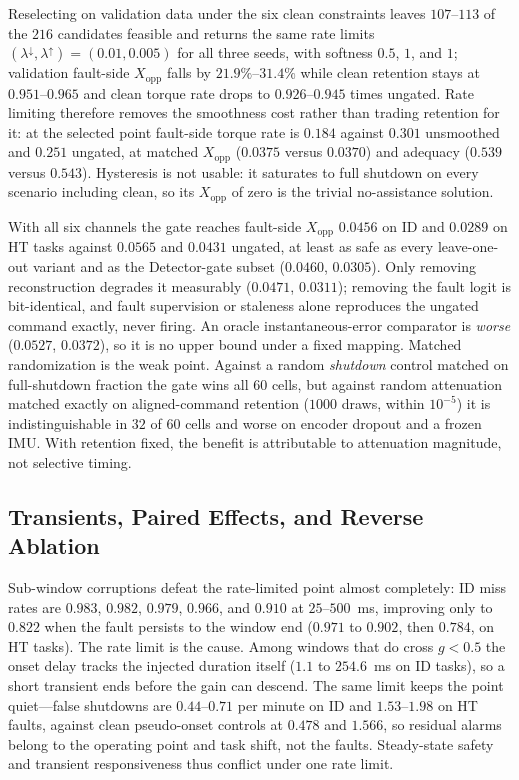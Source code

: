 \documentclass[letterpaper]{article} %
\begin{document}
Reselecting on validation data under the six clean constraints leaves $107$--$113$ of the $216$ candidates feasible and returns the same rate limits $(\lambda^{\downarrow},\lambda^{\uparrow})=(0.01,0.005)$ for all three seeds, with softness $0.5$, $1$, and $1$; validation fault-side $X_{\mathrm{opp}}$ falls by $21.9\%$--$31.4\%$ while clean retention stays at $0.951$--$0.965$ and clean torque rate drops to $0.926$--$0.945$ times ungated. Rate limiting therefore removes the smoothness cost rather than trading retention for it: at the selected point fault-side torque rate is $0.184$ against $0.301$ unsmoothed and $0.251$ ungated, at matched $X_{\mathrm{opp}}$ ($0.0375$ versus $0.0370$) and adequacy ($0.539$ versus $0.543$). Hysteresis is not usable: it saturates to full shutdown on every scenario including clean, so its $X_{\mathrm{opp}}$ of zero is the trivial no-assistance solution.

With all six channels the gate reaches fault-side $X_{\mathrm{opp}}$ $0.0456$ on ID and $0.0289$ on HT tasks against $0.0565$ and $0.0431$ ungated, at least as safe as every leave-one-out variant and as the Detector-gate subset ($0.0460$, $0.0305$). Only removing reconstruction degrades it measurably ($0.0471$, $0.0311$); removing the fault logit is bit-identical, and fault supervision or staleness alone reproduces the ungated command exactly, never firing. An oracle instantaneous-error comparator is \emph{worse} ($0.0527$, $0.0372$), so it is no upper bound under a fixed mapping. Matched randomization is the weak point. Against a random \emph{shutdown} control matched on full-shutdown fraction the gate wins all $60$ cells, but against random attenuation matched exactly on aligned-command retention ($1000$ draws, within $10^{-5}$) it is indistinguishable in $32$ of $60$ cells and worse on encoder dropout and a frozen IMU. With retention fixed, the benefit is attributable to attenuation magnitude, not selective timing.

\subsection{Transients, Paired Effects, and Reverse Ablation}

Sub-window corruptions defeat the rate-limited point almost completely: ID miss rates are $0.983$, $0.982$, $0.979$, $0.966$, and $0.910$ at $25$--$500$~ms, improving only to $0.822$ when the fault persists to the window end ($0.971$ to $0.902$, then $0.784$, on HT tasks). The rate limit is the cause. Among windows that do cross $g<0.5$ the onset delay tracks the injected duration itself ($1.1$ to $254.6$~ms on ID tasks), so a short transient ends before the gain can descend. The same limit keeps the point quiet---false shutdowns are $0.44$--$0.71$ per minute on ID and $1.53$--$1.98$ on HT faults, against clean pseudo-onset controls at $0.478$ and $1.566$, so residual alarms belong to the operating point and task shift, not the faults. Steady-state safety and transient responsiveness thus conflict under one rate limit.
\end{document}
